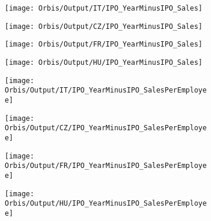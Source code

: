 \documentclass[12pt,notitlepage]{article}
\begin{document}
\begin{figure}[htpb]
\centering
\caption{IPO and Sales}
\begin{subfigure}{.49\textwidth}
    \centering
 \texttt{[image: Orbis/Output/IT/IPO\_YearMinusIPO\_Sales]}
\end{subfigure}%
\begin{subfigure}{.49\textwidth}
    \centering
 \texttt{[image: Orbis/Output/CZ/IPO\_YearMinusIPO\_Sales]}
\end{subfigure}
\begin{subfigure}{.49\textwidth}
    \centering
 \texttt{[image: Orbis/Output/FR/IPO\_YearMinusIPO\_Sales]}
\end{subfigure}%
\begin{subfigure}{.49\textwidth}
    \centering
 \texttt{[image: Orbis/Output/HU/IPO\_YearMinusIPO\_Sales]}
\end{subfigure}
\end{figure}

\begin{figure}[htpb]
\centering
\caption{IPO and Sales per Employee}
\begin{subfigure}{.49\textwidth}
    \centering
 \texttt{[image: Orbis/Output/IT/IPO\_YearMinusIPO\_SalesPerEmployee]}
\end{subfigure}%
\begin{subfigure}{.49\textwidth}
    \centering
 \texttt{[image: Orbis/Output/CZ/IPO\_YearMinusIPO\_SalesPerEmployee]}
\end{subfigure}
\begin{subfigure}{.49\textwidth}
    \centering
 \texttt{[image: Orbis/Output/FR/IPO\_YearMinusIPO\_SalesPerEmployee]}
\end{subfigure}%
\begin{subfigure}{.49\textwidth}
    \centering
 \texttt{[image: Orbis/Output/HU/IPO\_YearMinusIPO\_SalesPerEmployee]}
\end{subfigure}
\end{figure}
\end{document}
